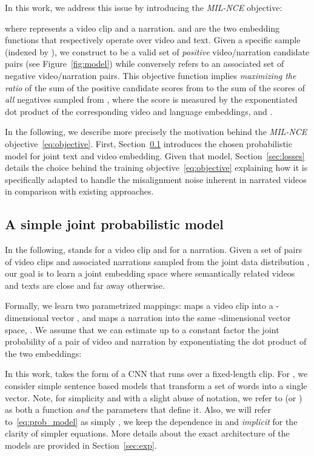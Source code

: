 \documentclass[10pt,twocolumn,letterpaper]{article}
\begin{document}
In this work, we address this issue by introducing the \emph{MIL-NCE} objective:

where  represents a video clip and  a narration.
 and  are the two embedding functions that respectively operate over video and text.
Given a specific sample (indexed by ), we construct  to be a valid set of \emph{positive} video/narration candidate pairs (see Figure~\ref{fig:model}) while  conversely refers to an associated set of negative video/narration pairs.
This objective function implies \emph{maximizing the ratio} of the sum of the positive candidate scores from  to the sum of the scores of \emph{all} negatives sampled from , where the score is measured by the exponentiated dot product of the corresponding video and language embeddings,  and .




In the following, we describe more precisely the motivation behind the \emph{MIL-NCE} objective~\eqref{eq:objective}.
First, Section~\ref{sec:model} introduces the chosen probabilistic model for joint text and video embedding.
Given that model, Section~\ref{sec:losses} details the choice behind the training objective~\eqref{eq:objective} explaining how it is specifically adapted to handle the misalignment noise inherent in narrated videos in comparison with existing approaches.


\subsection{A simple joint probabilistic model}
\label{sec:model}
In the following,  stands for a video clip and  for a narration.
Given a set of  pairs of video clips and associated narrations   sampled from the joint data distribution ,
our goal is to learn a joint embedding space where semantically related videos and texts are close and far away otherwise.

Formally, we learn two parametrized mappings:  maps a video clip  into a -dimensional vector ,  and  maps a narration  into the same -dimensional vector space, .
We assume that we can estimate up to a constant factor the joint probability of a pair of video and narration  by exponentiating the dot product of the two embeddings:

In this work,  takes the form of a CNN that runs over a fixed-length clip.
For , we consider simple sentence based models that transform a set of words into a single vector.
Note,  for simplicity and with a slight abuse of notation, we refer to  (or ) as both a function \emph{and} the parameters that define it.
Also, we will refer to~\eqref{eq:prob_model} as simply , \ie we keep the dependence in  and  \emph{implicit} for the clarity of simpler equations.
More details about the exact architecture of the models are provided in Section~\ref{sec:exp}.
\end{document}
